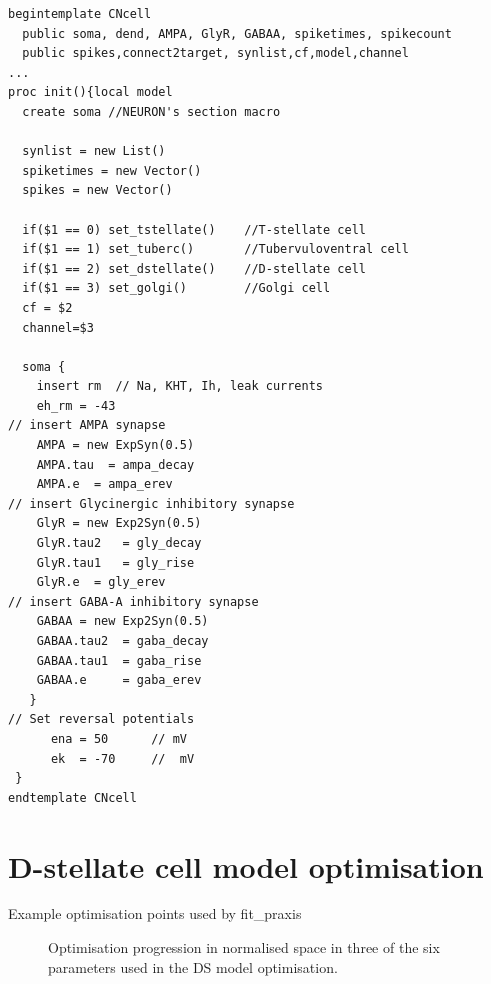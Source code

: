 \begin{lstlisting}[label=lst:CellTemplate,caption=Rothman and Manis cochlear
  nucleus cell template (in CNcell.tem)]
begintemplate CNcell
  public soma, dend, AMPA, GlyR, GABAA, spiketimes, spikecount
  public spikes,connect2target, synlist,cf,model,channel
...
proc init(){local model
  create soma //NEURON's section macro 

  synlist = new List()
  spiketimes = new Vector()
  spikes = new Vector()
    
  if($1 == 0) set_tstellate()    //T-stellate cell
  if($1 == 1) set_tuberc()       //Tubervuloventral cell
  if($1 == 2) set_dstellate()    //D-stellate cell
  if($1 == 3) set_golgi()        //Golgi cell
  cf = $2
  channel=$3

  soma {
    insert rm  // Na, KHT, Ih, leak currents 
    eh_rm = -43 
// insert AMPA synapse 
    AMPA = new ExpSyn(0.5)
    AMPA.tau  = ampa_decay
    AMPA.e 	= ampa_erev
// insert Glycinergic inhibitory synapse 
    GlyR = new Exp2Syn(0.5)
    GlyR.tau2	= gly_decay
    GlyR.tau1	= gly_rise
    GlyR.e 	= gly_erev
// insert GABA-A inhibitory synapse 
    GABAA = new Exp2Syn(0.5)
    GABAA.tau2 	= gaba_decay
    GABAA.tau1 	= gaba_rise
    GABAA.e 	= gaba_erev
   }
// Set reversal potentials 
      ena = 50		// mV
      ek  = -70		//  mV
 }
endtemplate CNcell 

\end{lstlisting}

\section{D-stellate cell model optimisation}

Example optimisation points used by fit_praxis 
\begin{figure}[htb]
\centering
{}
 \caption{Optimisation progression in normalised space in three of the six parameters used in the DS model optimisation.} \label{fig:DShandtuned}
 \end{figure}


